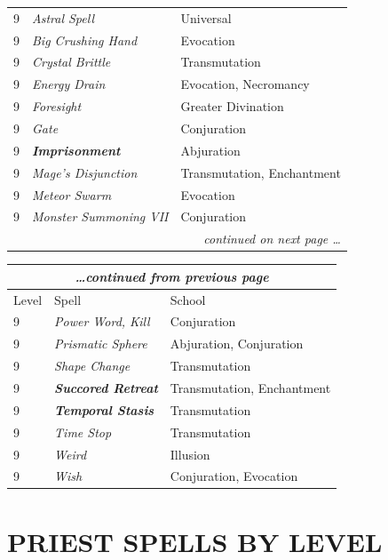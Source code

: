 \begin{multicols}{2}
\begin{tabular}{|p{}|p{}|p{}|}
\rowcolor[gray]{.9}9	& \textit{Astral Spell}	& Universal \\
9	& \textit{Big Crushing Hand}	& Evocation \\
\rowcolor[gray]{.9}9	& \textit{Crystal Brittle}	& Transmutation \\
9	& \textit{Energy Drain}	& Evocation, Necromancy \\
\rowcolor[gray]{.9}9	& \textit{Foresight}	& Greater Divination \\
9	& \textit{Gate}	& Conjuration \\
\rowcolor[gray]{.9}9	& \textbf{\textit{Imprisonment}}	& Abjuration \\
9	& \textit{Mage's Disjunction}	& Transmutation, Enchantment \\
\rowcolor[gray]{.9}9	& \textit{Meteor Swarm}	& Evocation \\
9	& \textit{Monster Summoning VII}	& Conjuration \\
\hline
\multicolumn{3}{r}{\textit{continued on next page \ldots}} \\
\end{tabular}

\noindent
\begin{tabular}{|p{}|p{}|p{}|}
\multicolumn{3}{c}{\textit{\ldots continued from previous page}} \\
\hline
Level	& Spell	& School \\
\hline\hline
\rowcolor[gray]{.9}9	& \textit{Power Word, Kill}	& Conjuration \\
9	& \textit{Prismatic Sphere}	& Abjuration, Conjuration \\
\rowcolor[gray]{.9}9	& \textit{Shape Change}	& Transmutation \\
9	& \textbf{\textit{Succored Retreat}}	& Transmutation, Enchantment \\
\rowcolor[gray]{.9}9	& \textbf{\textit{Temporal Stasis}}	& Transmutation \\
9	& \textit{Time Stop}	& Transmutation \\
\rowcolor[gray]{.9}9	& \textit{Weird}	& Illusion \\
9	& \textit{Wish}	& Conjuration, Evocation \\
\hline
\end{tabular}

\section{PRIEST SPELLS BY LEVEL}


\end{multicols}
